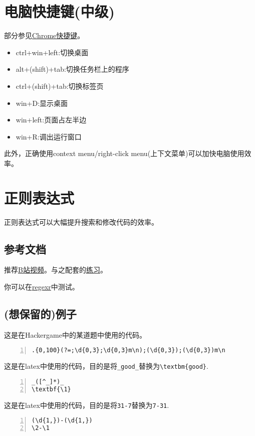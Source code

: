 \documentclass[11pt]{amsart}
\begin{document}
\section{电脑快捷键(中级)}
部分参见\href{https://zhuanlan.zhihu.com/p/42281412}{Chrome快捷键}。
\begin{itemize}
	\item  ctrl+win+left:切换桌面
	\item  alt+(shift)+tab:切换任务栏上的程序
	\item  ctrl+(shift)+tab:切换标签页
	\item  win+D:显示桌面
	\item  win+left:页面占左半边
	\item  win+R:调出运行窗口
\end{itemize} 
此外，正确使用context menu/right-click menu(上下文菜单)可以加快电脑使用效率。

\section{正则表达式}
正则表达式可以大幅提升搜索和修改代码的效率。

\subsection{参考文档}
推荐\href{https://www.bilibili.com/video/BV19t4y1y7qP}{B站视频}。与之配套的\href{https://codejiaonang.com/#/course/regex_chapter1/}{练习}。

你可以在\href{https://regexr-cn.com/}{regexr}中测试。

\subsection{(想保留的)例子}
这是在Hackergame中的某道题中使用的代码。
\begin{lstlisting}[numbers=left,numberstyle=\tiny,numbersep=10pt]
.{0,100}(?=;\d{0,3};\d{0,3}m\n);(\d{0,3});(\d{0,3})m\n
\end{lstlisting}
这是在latex中使用的代码，目的是将\lstinline|_good_|替换为\lstinline|\textbm{good}|.
\begin{lstlisting}[numbers=left,numberstyle=\tiny,numbersep=10pt]
_([^_]*)_
\textbf{\1}
\end{lstlisting}

这是在latex中使用的代码，目的是将\lstinline|31-7|替换为\lstinline|7-31|.
\begin{lstlisting}[numbers=left,numberstyle=\tiny,numbersep=10pt]
(\d{1,})-(\d{1,})
\2-\1
\end{lstlisting}
\end{document}

